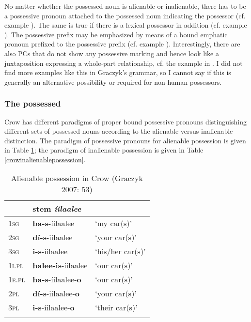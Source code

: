 \documentclass[output=paper]{LSP/langsci}
\begin{document}
No matter whether the possessed noun is alienable or inalienable, there has to be a possessive pronoun attached to the possessed noun indicating the possessor (cf. example ). The same is true if there is a lexical possessor in addition (cf. example ). The possessive prefix may be emphasized by means of a bound emphatic pronoun prefixed to the possessive prefix (cf. example ). Interestingly, there are also PCs that do not show any possessive marking and hence look like a juxtaposition expressing a whole-part relationship, cf. the example in . I did not find more examples like this in Graczyk's grammar, so I cannot say if this is generally an alternative possibility or required for non-human possessors.

\subsubsection{The possessed}
Crow has different paradigms of proper bound possessive pronouns distinguishing different sets of possessed nouns according to the alienable versus inalienable distinction. The paradigm of possessive pronouns for alienable possession is given in Table \ref{crowalienablepossession}; the paradigm of inalienable possession is given in Table \ref{crowinalienablepossession}.

\begin{table}
\caption{Alienable possession in Crow (Graczyk 2007: 53)} \label{crowalienablepossession}
\begin{tabular}[h!]{ l l l}
\lsptoprule
& stem \textit{íilaalee} & \\
\midrule 	
\textsc{1sg} & \textbf{ba-s}-íilaalee	& `my car(s)' \\
 
\textsc{2sg} & \textbf{dí-s}-iilaalee & `your car(s)' \\
 
\textsc{3sg} & \textbf{i-s}-íilaalee & `his/her car(s)' \\
 
\textsc{1i.pl} & \textbf{balee-is}-íilaalee & `our car(s)' \\
 
\textsc{1e.pl} & \textbf{ba-s}-íilaalee-\textbf{o} & `our car(s)' \\
 
\textsc{2pl} & \textbf{dí-s}-iilaalee-\textbf{o} & `your car(s)' \\
 
\textsc{3pl} & \textbf{i-s}-íilaalee-\textbf{o} & `their car(s)' \\
\lspbottomrule
\end{tabular}
\end{table}
\end{document}
